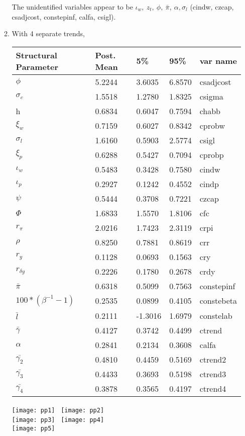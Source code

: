 \documentclass[]{article}
\begin{document}
\begin{enumerate}
\begin{enumerate}
The unidentified variables appear to be $ \iota_w, \ z_t, \ \phi, \ \bar{\pi}, \ \alpha, \sigma_l $ (cindw, czcap, csadjcost, constepinf, calfa, csigl). 

\item With 4 separate trends, 
	\begin{center}
		\begin{tabular}{l l l l l}
			Structural Parameter & Post. Mean & 5\% & 95\% & var name \\  
			\hline 
			$ \phi  $ & 5.2244    &  3.6035   &   6.8570 & csadjcost \\
			$\sigma_c $ & 1.5518 &     1.2780   &   1.8325& csigma\\
			h &0.6834   &   0.6047  &    0.7594& chabb  \\
			$\xi_w $ &  0.7159   &   0.6027   &   0.8342 & cprobw \\
			$ \sigma_l $ & 1.6160   &   0.5903   &   2.5774  & csigl \\
			$ \xi_p $ & 0.6288   &   0.5427   &   0.7094  & cprobp \\
			$ \iota_w $ &0.5483  &    0.3428  &    0.7580 & cindw \\
			$ \iota_p $ & 0.2927  &    0.1242  &    0.4552 & cindp\\ 
			$ \psi $ & 0.5444     & 0.3708   &   0.7221  & czcap \\
			$ \Phi $ &1.6833    &  1.5570   &   1.8106& cfc \\
			$ r_{\pi} $ &  2.0216   &   1.7423   &   2.3119& crpi \\
			$ \rho $ & 0.8250    &  0.7881  &    0.8619  & crr\\
			$ r_y $ & 0.1128   &   0.0693   &   0.1563& cry \\
			$ r_{\delta y} $ & 0.2226    &  0.1780   &   0.2678 & crdy\\
			$ \bar{\pi} $ & 0.6318   &   0.5099  &    0.7563 & constepinf\\
			$ 100*(\beta^{-1} -1 ) $ &  0.2535   &   0.0899   &   0.4105& constebeta \\
			$ \bar{l} $ & 0.2111   &  -1.3016  &    1.6979&  constelab\\
			$ \bar{\gamma} $ & 0.4127   &   0.3742   &   0.4499& ctrend \\
			$ \alpha $ & 0.2841  &    0.2134   &   0.3608 & calfa \\
			$ \bar{\gamma_2} $ & 0.4810   &   0.4459  &    0.5169 & ctrend2 \\
			$ \bar{\gamma_3} $ & 0.4433   &   0.3693  &    0.5198 & ctrend3 \\
			$ \bar{\gamma_4} $ & 0.3878   &   0.3565  &    0.4197 & ctrend4 \\
			\hline 
		\end{tabular}
	\end{center}
	\texttt{[image: pp1]} \	\texttt{[image: pp2]} \\
	\texttt{[image: pp3]} \	\texttt{[image: pp4]}	\\
	\texttt{[image: pp5]}
	

\end{enumerate}
\end{enumerate}
\end{document}
